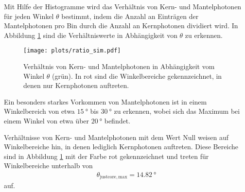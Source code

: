 Mit Hilfe der Histogramme wird das Verhältnis von Kern- und Mantelphotonen für jeden Winkel $\theta$ bestimmt, indem die Anzahl an Einträgen der Mantelphotonen pro Bin durch die Anzahl an Kernphotonen dividiert wird. In Abbildung \ref{fig:ratio_sim} sind die Verhältniswerte in Abhängigkeit von $\theta$ zu erkennen.
\begin{figure}
    \centering
    \texttt{[image: plots/ratio\_sim.pdf]}
    \caption{Verhältnis von Kern- und Mantelphotonen in Abhängigkeit vom Winkel $\theta$ (grün). In rot sind die Winkelbereiche gekennzeichnet, in denen nur Kernphotonen auftreten.}
    \label{fig:ratio_sim}
\end{figure} 
\FloatBarrier
Ein besonders starkes Vorkommen von Mantelphotonen ist in einem Winkelbereich von etwa $\SI{15}{°}$ bis $\SI{30}{°}$ zu erkennen, wobei sich das Maximum bei einem Winkel von etwa über $\SI{20}{°}$ befindet.

Verhältnisse von Kern- und Mantelphotonen mit dem Wert Null weisen auf Winkelbereiche hin, in denen lediglich Kernphotonen auftreten. Diese Bereiche sind in Abbildung \ref{fig:ratio_sim} mit der Farbe rot gekennzeichnet und treten für Winkelbereiche unterhalb von
\begin{align*}
    \theta_\mathrm{just core, max} = \SI{14.82}{°}
\end{align*}
auf. \\

